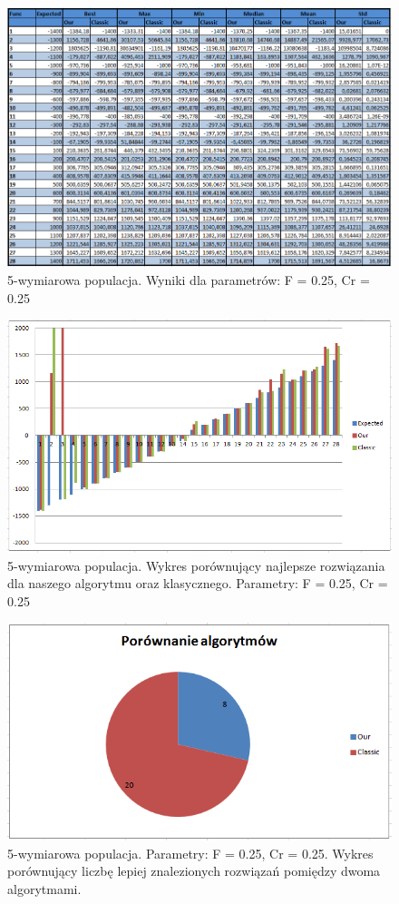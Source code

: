 \documentclass[a4paper]{article}
\begin{document}
\begin{figure}[!h]
\centering
\includegraphics[width=\textwidth]{F25Cr25L5tab.png}
\caption{5-wymiarowa populacja. Wyniki dla parametrów: F = 0.25, Cr = 0.25}
\end{figure}

\begin{figure}[!h]
\centering
\includegraphics[width=\textwidth]{F25Cr25L5chart.png}
\caption{5-wymiarowa populacja. Wykres porównujący najlepsze rozwiązania dla naszego algorytmu oraz klasycznego. Parametry: F = 0.25, Cr = 0.25}
\end{figure}

\begin{figure}[!h]
\centering
\includegraphics[width=\textwidth]{F25Cr25L5statystyka.png}
\caption{5-wymiarowa populacja. Parametry: F = 0.25, Cr = 0.25. Wykres porównujący liczbę lepiej znalezionych rozwiązań pomiędzy dwoma algorytmami.}
\end{figure}
\end{document}
